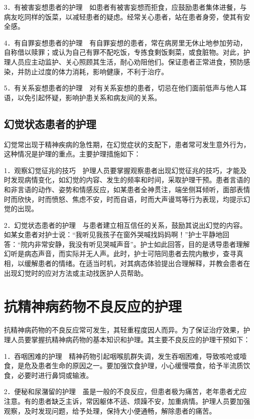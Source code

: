 3．有被害妄想患者的护理　如患者有被害妄想而拒食，应鼓励患者集体进餐，与病友吃同样的饭菜，以减轻患者的疑虑。经常关心患者，站在患者身旁，使其有安全感。

4．有自罪妄想患者的护理　有自罪妄想的患者，常在病房里无休止地参加劳动，自称借以赎罪；或认为自己有罪不配吃饭，专拣食剩饭剩菜，或食脏物。对此，护理人员应主动监护、关心照顾其生活，耐心劝阻他们。保证患者正常进食，预防感染，并防止过度的体力消耗，影响健康，不利于治疗。

5．有关系妄想患者的护理　对有关系妄想的患者，切忌在他们面前低声与他人耳语，以免引起怀疑，影响护患关系和病友间的关系。

\subsection{幻觉状态患者的护理}

幻觉常出现于精神疾病的急性期，在幻觉症状的支配下，患者常可发生意外行为，这种情况是护理的重点。主要护理措施如下：

1．观察幻觉征兆的技巧　护理人员要掌握观察患者出现幻觉征兆的技巧，才能及时发现病情变化，如幻觉的内容、发生的频率和时间，采取护理干预。患者言语的和非言语的动作、姿势和情感反应，如某患者全神贯注，端坐侧耳倾听，面部表情时而欣快，时而愤怒、焦虑不安，时而自语，时而大声谩骂等行为表现，均提示幻觉的出现。

2．幻觉状态患者的护理　与患者建立相互信任的关系，鼓励其说出幻觉的内容。如某女患者对护士说：“我听见我孩子在窗外哭喊找妈妈啊！”护士平静地回答：“院内非常安静，我没有听见哭喊声音”。护士如此回答，目的是诱导患者理解幻听是病态声音，而实际并无人声。此时，护士可陪同患者去院内散步，查寻真相，以缓解患者的情绪。在适当时机，对其病态体验提出合理解释，并教会患者在出现幻觉时的应对方法或主动找医护人员帮助。

\section{抗精神病药物不良反应的护理}

抗精神病药物的不良反应常可发生，其轻重程度因人而异。为了保证治疗效果，护理人员要掌握抗精神病药物的基本知识和护理。其主要不良反应的护理干预如下：

1．吞咽困难的护理　精神药物引起咽喉肌群失调，发生吞咽困难，导致咳呛或噎食，是危及患者生命的原因之一。要加强饮食护理，小心缓慢喂食，给予半流质饮食，必要时进行鼻饲或输液。

2．便秘和尿潴留的护理　虽是一般的不良反应，但患者极为痛苦，老年患者尤应注意。有的患者缺乏主诉，常因躯体不适、烦躁不安，加重病情。护理人员要加强观察，及时发现问题，给予处理，保持大小便通畅，解除患者的痛苦。

